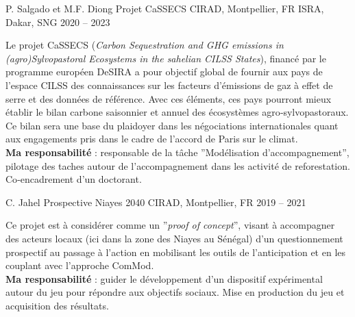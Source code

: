 

\begin{cventries}

  \cventry
    {P. Salgado et M.F. Diong} %
    {Projet CaSSECS} %
    {CIRAD, Montpellier, FR \hspace{5em} ISRA, Dakar, SNG} %
    {2020 -- 2023} %
    {
      \begin{cvitems} %
        Le projet CaSSECS (\emph{Carbon Sequestration and GHG emissions in (agro)Sylvopastoral Ecosystems in the sahelian CILSS States}), financé par le programme européen DeSIRA a pour objectif global de fournir aux pays de l’espace CILSS des connaissances sur les facteurs d’émissions de gaz à effet de serre et des données de référence. Avec ces éléments, ces pays pourront mieux établir le bilan carbone saisonnier et annuel des écosystèmes agro‑sylvopastoraux. Ce bilan sera une base du plaidoyer dans les négociations internationales quant aux engagements pris dans le cadre de l’accord de Paris sur le climat.\\
        \textbf{Ma responsabilité } : responsable de la tâche ”Modélisation d’accompagnement”, pilotage des taches autour de l'accompagnement dans les activité de reforestation. Co‑encadrement d’un doctorant.
      \end{cvitems}
    }

  \cventry
  {C. Jahel} %
  {Prospective Niayes 2040} %
  {CIRAD, Montpellier, FR} %
  {2019 -- 2021} %
  {
    \begin{cvitems} %
      Ce projet est à considérer comme un ”\textit{proof of concept}”, visant à accompagner des acteurs locaux (ici dans la zone des Niayes au Sénégal) d’un questionnement prospectif au passage à l’action en mobilisant les outils de l’anticipation et en les couplant avec l’approche ComMod.\\
      \textbf{Ma responsabilité} : guider le développement d'un dispositif expérimental autour du jeu pour répondre aux objectifs sociaux. Mise en production du jeu et acquisition des résultats.
    \end{cvitems}
  }


\end{cventries}
